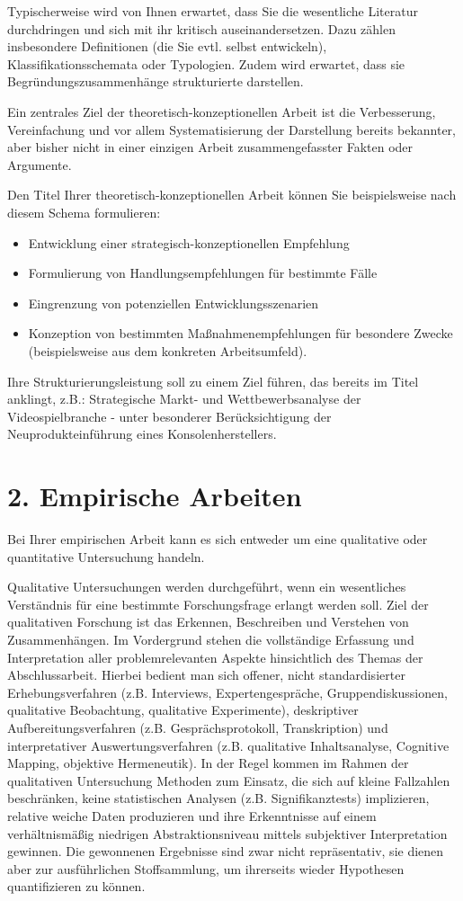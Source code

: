 Typischerweise wird von Ihnen erwartet, dass Sie die wesentliche Literatur durchdringen und sich mit ihr kritisch auseinandersetzen. Dazu zählen insbesondere Definitionen (die Sie evtl. selbst entwickeln), Klassifikationsschemata oder Typologien. Zudem wird erwartet, dass sie Begründungszusammenhänge strukturierte darstellen.

Ein zentrales Ziel der theoretisch-konzeptionellen Arbeit ist die Verbesserung, Vereinfachung und vor allem Systematisierung der Darstellung bereits bekannter, aber bisher nicht in einer einzigen Arbeit zusammengefasster Fakten oder Argumente.

Den Titel Ihrer theoretisch-konzeptionellen Arbeit können Sie beispielsweise nach diesem Schema formulieren:
\begin{itemize}
\item Entwicklung einer strategisch-konzeptionellen Empfehlung
\item Formulierung von Handlungsempfehlungen für bestimmte Fälle
\item Eingrenzung von potenziellen Entwicklungsszenarien
\item Konzeption von bestimmten Maßnahmenempfehlungen für besondere Zwecke (beispielsweise aus dem konkreten Arbeitsumfeld).
\end{itemize}

Ihre Strukturierungsleistung soll zu einem Ziel führen, das bereits im Titel anklingt, z.B.: \glqq Strategische Markt- und Wettbewerbsanalyse der Videospielbranche - unter besonderer Berücksichtigung der Neuprodukteinführung eines Konsolenherstellers\grqq{}.

\section*{2. Empirische Arbeiten}

Bei Ihrer empirischen Arbeit kann es sich entweder um eine qualitative oder quantitative Untersuchung handeln.

Qualitative Untersuchungen werden durchgeführt, wenn ein wesentliches Verständnis für eine bestimmte Forschungsfrage erlangt werden soll. Ziel der qualitativen Forschung ist das Erkennen, Beschreiben und Verstehen von Zusammenhängen. Im Vordergrund stehen die vollständige Erfassung und Interpretation aller problemrelevanten Aspekte hinsichtlich des Themas der Abschlussarbeit. Hierbei bedient man sich offener, nicht standardisierter Erhebungsverfahren (z.B. Interviews, Expertengespräche, Gruppendiskussionen, qualitative Beobachtung, qualitative Experimente), deskriptiver Aufbereitungsverfahren (z.B. Gesprächsprotokoll, Transkription) und interpretativer Auswertungsverfahren (z.B. qualitative Inhaltsanalyse, Cognitive Mapping, objektive Hermeneutik). In der Regel kommen im Rahmen der qualitativen Untersuchung Methoden zum Einsatz, die sich auf kleine Fallzahlen beschränken, keine statistischen Analysen (z.B. Signifikanztests) implizieren, relative weiche Daten produzieren und ihre Erkenntnisse auf einem verhältnismäßig niedrigen Abstraktionsniveau mittels subjektiver Interpretation gewinnen. Die gewonnenen Ergebnisse sind zwar nicht repräsentativ, sie dienen aber zur ausführlichen Stoffsammlung, um ihrerseits wieder Hypothesen quantifizieren zu können.

